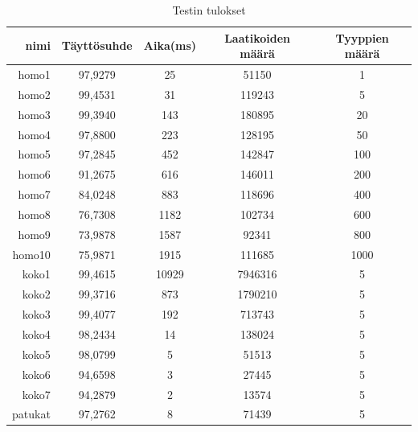 \documentclass[a4paper,12pt, titlepage]{article}
\begin{document}
\begin{table}[h]
\begin{tabular}{r|c|c|c|c}
\textbf{nimi} & \textbf{Täyttösuhde} & \textbf{Aika(ms)} & \textbf{Laatikoiden määrä} & \textbf{Tyyppien määrä} \\
\hline
homo1         & 97,9279              & 25            & 51150                      & 1                       \\
homo2         & 99,4531              & 31            & 119243                     & 5                       \\
homo3         & 99,3940              & 143           & 180895                     & 20                      \\
homo4         & 97,8800              & 223           & 128195                     & 50                      \\
homo5         & 97,2845              & 452           & 142847                     & 100                     \\
homo6         & 91,2675              & 616           & 146011                     & 200                     \\
homo7         & 84,0248              & 883           & 118696                     & 400                     \\
homo8         & 76,7308              & 1182          & 102734                     & 600                     \\
homo9         & 73,9878              & 1587          & 92341                      & 800                     \\
homo10        & 75,9871              & 1915          & 111685                     & 1000                    \\
\hline
koko1         & 99,4615              & 10929         & 7946316                    & 5                       \\
koko2         & 99,3716              & 873           & 1790210                    & 5                       \\
koko3         & 99,4077              & 192           & 713743                     & 5                       \\
koko4         & 98,2434              & 14            & 138024                     & 5                       \\
koko5         & 98,0799              & 5             & 51513                      & 5                       \\
koko6         & 94,6598              & 3             & 27445                      & 5                       \\
koko7         & 94,2879              & 2             & 13574                      & 5                       \\
\hline
patukat       & 97,2762              & 8             & 71439                      & 5                      
\end{tabular}
\caption{Testin tulokset}
\end{table}
\end{document}
